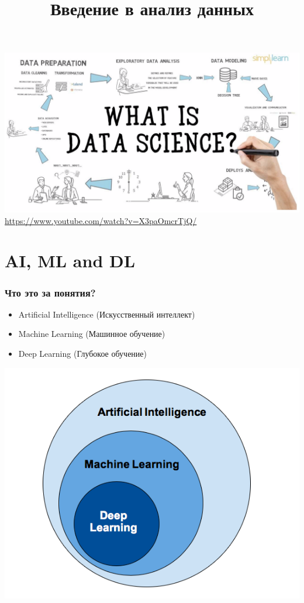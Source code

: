 \documentclass[aspectratio=169,newPxFont]{beamer}
\title{Введение в анализ данных}
\begin{document}
\maketitle

\begin{frame}{}
\centering \includegraphics[width=1\linewidth]{what_is_ds.png}\\
\vspace{0.2cm}
{\url{https://www.youtube.com/watch?v=X3paOmcrTjQ/}}
\end{frame}


\section{AI, ML and DL}

\begin{frame}
\frametitle{Что это за понятия?}
\begin{itemize}
	\item Artificial Intelligence (Искусственный интеллект)
	\item Machine Learning (Машинное обучение)
	\item Deep Learning (Глубокое обучение)
\end{itemize}
\end{frame}

\begin{frame}{}
\centering \includegraphics[width=0.8\linewidth]{ai_ml_dl.png}\\
\end{frame}
\end{document}
